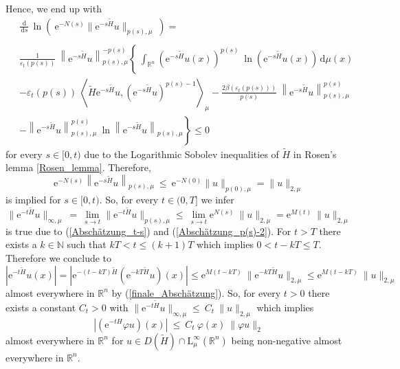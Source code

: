 \documentclass[12pt,longbibliography]{article}
\def\N{\mathbb{N}}
\def\R{\mathbb{R}}
\def\d{\,\mathrm{d}}
\theoremstyle{definition}
\theoremstyle{remark}
\theoremstyle{example}
\begin{document}
Hence, we end up with
\begin{align*}
& \frac{\d}{\d s} \ \ln \left( \ \mathrm{e}^{-N(s)}  \| \mathrm{e}^{-s\tilde{H}} u \|_{p(s),\mu} \ \right)  = \\
\ \\
& \frac{1}{ \varepsilon_{t}\left( p(s) \right) } \ \left\| \mathrm{e}^{-s\tilde{H}} u \right\|_{p(s),\mu}^{-p(s)}
 \left\{ \ \int_{\R^{n}} (\mathrm{e}^{-s\tilde{H}} u (x) )^{p(s)} \ \ln \left( \mathrm{e}^{-s\tilde{H}} u(x) \right) \d \mu(x) \right. \\
& - \varepsilon_{t}\left( p(s) \right) \  
\left\langle \tilde{H} \mathrm{e}^{-s\tilde{H}} u, (\mathrm{e}^{-s\tilde{H}} u)^{p(s)-1} \right\rangle_{\mu}
 - \frac{2\beta\left( \varepsilon_{t}\left( p(s) \right) \right)}{p(s)} \ \left\| \mathrm{e}^{-s\tilde{H}} u \right\|_{p(s),\mu}^{p(s)} \\
& \left.
 - \left\| \mathrm{e}^{-s\tilde{H}} u \right\|_{p(s),\mu}^{p(s)} \ 
\ln \left\| \mathrm{e}^{-s\tilde{H}} u \right\|_{p(s),\mu} \right\} \leq 0
\end{align*}
for every $s \in [0,t)$ due to the Logarithmic Sobolev inequalities of $\tilde{H}$ in Rosen's lemma \ref{Rosen_lemma}. 
Therefore,
\begin{equation}\label{Abschätzung_p(s)-2}
 \mathrm{e}^{-N(s)}   \left\| \mathrm{e}^{-s\tilde{H}} u \right\|_{p(s),\mu}
 \ \leq \  \mathrm{e}^{-N(0)}  \| u \|_{p(0),\mu} = \| u \|_{2,\mu}
\end{equation}
is implied for $s \in [0,t)$. So, for every $t \in (0,T]$ we infer
\begin{equation}\label{finale_Abschätzung}
\| \mathrm{e}^{-t\tilde{H}}u \|_{\infty,\mu} \ 
= \ \lim_{s \to t}  \| \mathrm{e}^{-t\tilde{H}}u \|_{p(s),\mu}
 \leq \ 
\lim_{s \to t} \mathrm{e}^{N(s)} \ \| u \|_{2,\mu} =  \mathrm{e}^{M(t)} \ \| u \|_{2,\mu}
\end{equation}
is true due to (\ref{Abschätzung_t-s}) and (\ref{Abschätzung_p(s)-2}).
For $t > T$ there exists a $k \in \N$ such that $kT < t \leq (k+1)T$ which implies $0 < t -kT \leq T$. 
Therefore we conclude to 
$$
\left|  \mathrm{e}^{-t\tilde{H}}u (x) \right| = \left|  \mathrm{e}^{-(t-kT)\tilde{H}} \left( \mathrm{e}^{-kT\tilde{H}}u \right) (x) \right|
\leq  \mathrm{e}^{M(t-kT)} \ 
\|  \mathrm{e}^{-kT\tilde{H}} u \|_{2,\mu}
\leq \mathrm{e}^{M(t-kT)} \ \| u \|_{2,\mu}
$$
almost everywhere in $\R^{n}$ by (\ref{finale_Abschätzung}). So, for every $t > 0$ there exists
a constant $C_{t} > 0$ with
$
\| \mathrm{e}^{-t\tilde{H}}u \|_{\infty,\mu}  \leq \ C_{t} \  \| u \|_{2,\mu}
$
which implies
\begin{equation}\label{IU_Abschätzung}
\left| \left( \mathrm{e}^{-tH} \varphi u \right) (x) \right| \ \leq \ C_{t} \ \varphi (x) \ \| \varphi u\|_{2}  
\end{equation}
almost everywhere in $\R^{n}$ for $u \in D(\tilde{H}) \cap \mathrm{L}^{\infty}_{\mu}(\mathbb{R}^{n})$ 
being non-negative almost everywhere in $\mathbb{R}^{n}$.
\end{document}
